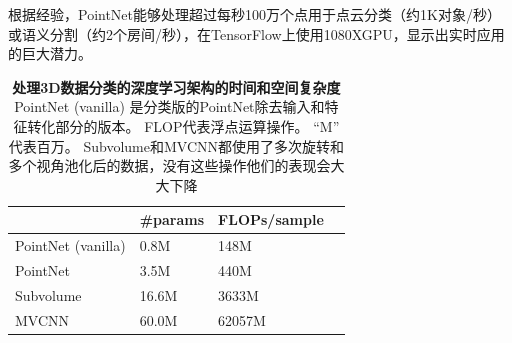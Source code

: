 根据经验，PointNet能够处理超过每秒100万个点用于点云分类（约1K对象/秒）或语义分割（约2个房间/秒），在TensorFlow上使用1080XGPU，显示出实时应用的巨大潜力。

\begin{table}[h!]
    \centering
    \begin{tabular}{|l|l|l|l|}
    \hline
    ~                & \#params & FLOPs/sample\\ \hline
    PointNet (vanilla)  & 0.8M                        & 148M \\
    PointNet         & 3.5M                         & 440M \\ \hline
    Subvolume~\cite{qi2016volumetric} & 16.6M                        & 3633M \\ \hline
    MVCNN~\cite{su15mvcnn}   & 60.0M                          & 62057M \\ \hline
    \end{tabular}
    \caption{\textbf{处理3D数据分类的深度学习架构的时间和空间复杂度} PointNet (vanilla) 是分类版的PointNet除去输入和特征转化部分的版本。 FLOP代表浮点运算操作。
    ``M'' 代表百万。 Subvolume和MVCNN都使用了多次旋转和多个视角池化后的数据，没有这些操作他们的表现会大大下降}
    \label{pointnet_complexity}
    \vspace{-3mm}
\end{table}
